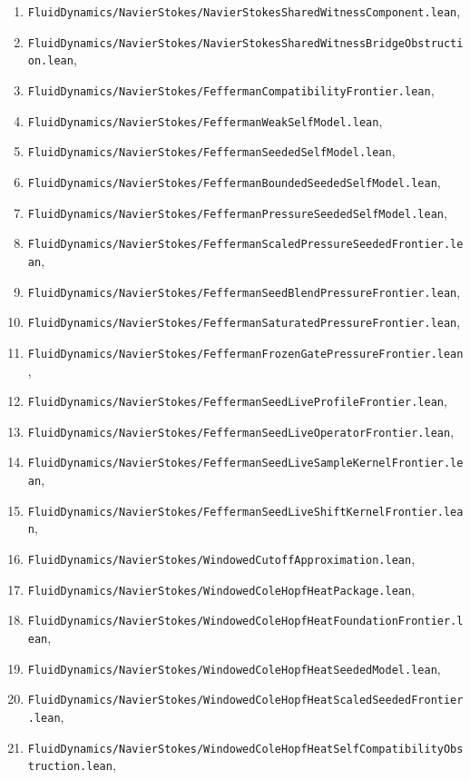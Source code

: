 \documentclass[11pt]{article}
\begin{document}
\begin{enumerate}[leftmargin=1.5em]
  \item \texttt{FluidDynamics/NavierStokes/NavierStokesSharedWitnessComponent.lean},
  \item \texttt{FluidDynamics/NavierStokes/NavierStokesSharedWitnessBridgeObstruction.lean},
  \item \texttt{FluidDynamics/NavierStokes/FeffermanCompatibilityFrontier.lean},
  \item \texttt{FluidDynamics/NavierStokes/FeffermanWeakSelfModel.lean},
  \item \texttt{FluidDynamics/NavierStokes/FeffermanSeededSelfModel.lean},
  \item \texttt{FluidDynamics/NavierStokes/FeffermanBoundedSeededSelfModel.lean},
  \item \texttt{FluidDynamics/NavierStokes/FeffermanPressureSeededSelfModel.lean},
  \item \texttt{FluidDynamics/NavierStokes/FeffermanScaledPressureSeededFrontier.lean},
  \item \texttt{FluidDynamics/NavierStokes/FeffermanSeedBlendPressureFrontier.lean},
  \item \texttt{FluidDynamics/NavierStokes/FeffermanSaturatedPressureFrontier.lean},
  \item \texttt{FluidDynamics/NavierStokes/FeffermanFrozenGatePressureFrontier.lean},
  \item \texttt{FluidDynamics/NavierStokes/FeffermanSeedLiveProfileFrontier.lean},
  \item \texttt{FluidDynamics/NavierStokes/FeffermanSeedLiveOperatorFrontier.lean},
  \item \texttt{FluidDynamics/NavierStokes/FeffermanSeedLiveSampleKernelFrontier.lean},
  \item \texttt{FluidDynamics/NavierStokes/FeffermanSeedLiveShiftKernelFrontier.lean},
  \item \texttt{FluidDynamics/NavierStokes/WindowedCutoffApproximation.lean},
  \item \texttt{FluidDynamics/NavierStokes/WindowedColeHopfHeatPackage.lean},
  \item \texttt{FluidDynamics/NavierStokes/WindowedColeHopfHeatFoundationFrontier.lean},
  \item \texttt{FluidDynamics/NavierStokes/WindowedColeHopfHeatSeededModel.lean},
  \item \texttt{FluidDynamics/NavierStokes/WindowedColeHopfHeatScaledSeededFrontier.lean},
  \item \texttt{FluidDynamics/NavierStokes/WindowedColeHopfHeatSelfCompatibilityObstruction.lean},

\end{enumerate}
\end{document}
